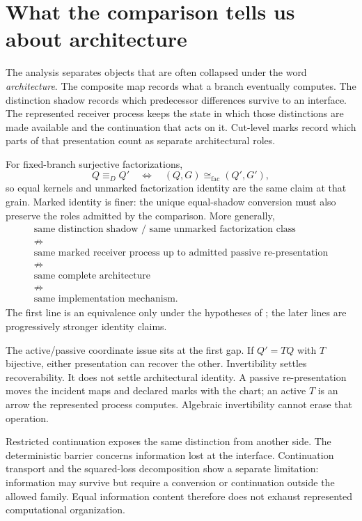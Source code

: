 \section{What the comparison tells us about architecture}\label{sec:scope-discussion}

The analysis separates objects that are often collapsed under the word \emph{architecture}. The composite map records what a branch eventually computes. The distinction shadow records which predecessor differences survive to an interface. The represented receiver process keeps the state in which those distinctions are made available and the continuation that acts on it. Cut-level marks record which parts of that presentation count as separate architectural roles.

For fixed-branch surjective factorizations,
\[
Q\equiv_DQ'
\quad\Longleftrightarrow\quad
(Q,G)\cong_{\mathrm{fac}}(Q',G'),
\]
so equal kernels and unmarked factorization identity are the same claim at that grain. Marked identity is finer: the unique equal-shadow conversion must also preserve the roles admitted by the comparison. More generally,
\[
\boxed{
\begin{array}{c}
\text{same distinction shadow / same unmarked factorization class}\\
\not\Rightarrow\\
\text{same marked receiver process up to admitted passive re-presentation}\\
\not\Rightarrow\\
\text{same complete architecture}\\
\not\Rightarrow\\
\text{same implementation mechanism}.
\end{array}}
\]
The first line is an equivalence only under the hypotheses of ; the later lines are progressively stronger identity claims.

The active/passive coordinate issue sits at the first gap. If $Q'=TQ$ with $T$ bijective, either presentation can recover the other. Invertibility settles recoverability. It does not settle architectural identity. A passive re-presentation moves the incident maps and declared marks with the chart; an active $T$ is an arrow the represented process computes. Algebraic invertibility cannot erase that operation.

Restricted continuation exposes the same distinction from another side. The deterministic barrier concerns information lost at the interface. Continuation transport and the squared-loss decomposition show a separate limitation: information may survive but require a conversion or continuation outside the allowed family. Equal information content therefore does not exhaust represented computational organization.

